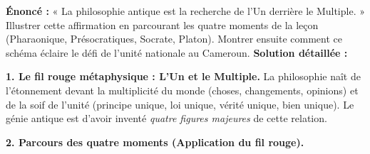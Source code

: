 \documentclass[11pt]{article}
\newcommand{\cle}[1]{{\popxbold\color{popdark}#1}}
\begin{document}
\begin{exoresolu}
\textbf{Énoncé :} « La philosophie antique est la recherche de l'Un derrière le Multiple. » Illustrer cette affirmation en parcourant les quatre moments de la leçon (Pharaonique, Présocratiques, Socrate, Platon). Montrer ensuite comment ce schéma éclaire le défi de l'unité nationale au Cameroun.
\tcblower
\textbf{Solution détaillée :}

\textbf{1. Le fil rouge métaphysique : L'Un et le Multiple.}
La philosophie naît de l'étonnement devant la \cle{multiplicité} du monde (choses, changements, opinions) et de la soif de l'\cle{unité} (principe unique, loi unique, vérité unique, bien unique). Le génie antique est d'avoir inventé \emph{quatre figures majeures} de cette relation.

\textbf{2. Parcours des quatre moments (Application du fil rouge).}


\end{exoresolu}
\end{document}
